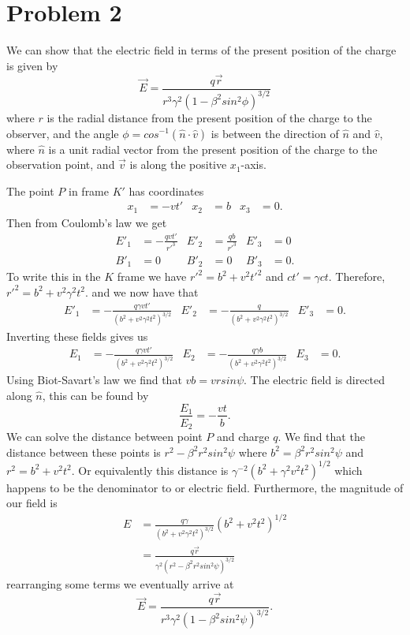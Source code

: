 \documentclass[11pt]{article}
\begin{document}
\section*{Problem 2}

We can show that the electric field in terms of the present position of the charge is given by
$$
\vec{E} = \frac{q\vec{r}}{r^{3}\gamma^{2}(1 - \beta^{2} sin^{2} \phi)^{3/2}}
$$
where $r$ is the radial distance from the present position of the charge to the observer, and the angle $\phi = cos^{-1}(\hat{n} \cdot \hat{v})$ is between the direction of $\hat{n}$ and $\hat{v}$, where $\hat{n}$ is a unit radial vector from the present position of the charge to the observation point, and $\vec{v}$ is along the positive $x_{1}$-axis.

The point $P$ in frame $K'$ has coordinates
\begin{align*}
    x_{1} &= -vt' &  x_{2} &= b &  x_{3} &= 0.
\end{align*}
Then from Coulomb's law we get
\begin{align*}
    E'_{1} &= -\frac{qvt'}{r'^{3}} &  E'_{2} &= \frac{qb}{r'^{3}} &  E'_{3} &= 0 \\
    B'_{1} &= 0 &  B'_{2} &= 0 &  B'_{3} &= 0.
\end{align*}
To write this in the $K$ frame we have $r'^{2} = b^{2} + v^{2}t'^{2}$ and $ct' = \gamma c t$. Therefore, $r'^{2} = b^{2} + v^{2} \gamma^{2} t^{2}$. and we now have that
\begin{align*}
    E'_{1} &= -\frac{q\gamma vt'}{(b^{2} + v^{2} \gamma^{2} t^{2})^{3/2}} &  E'_{2} &= -\frac{q}{(b^{2} + v^{2} \gamma^{2} t^{2})^{3/2}} &  E'_{3} &= 0.
\end{align*}
Inverting these fields gives us
\begin{align*}
    E_{1} &= -\frac{q\gamma vt'}{(b^{2} + v^{2} \gamma^{2} t^{2})^{3/2}} &  E_{2} &= -\frac{q\gamma b}{(b^{2} + v^{2} \gamma^{2} t^{2})^{3/2}} &  E_{3} &= 0.
\end{align*}
Using Biot-Savart's law we find that $vb = v r sin \psi$. The electric field is directed along $\hat{n}$, this can be found by 
$$
\frac{E_{1}}{E_{2}} = -\frac{vt}{b}.
$$
We can solve the distance between point $P$ and charge $q$. We find that the distance between these points is $r^{2} - \beta^{2} r^{2} sin^{2} \psi$ where $b^{2} = \beta^{2} r^{2} sin^{2} \psi$ and $r^{2} = b^{2} + v^{2} t^{2}$. Or equivalently this distance is $\gamma^{-2}(b^{2} + \gamma^{2} v^{2} t^{2})^{1/2}$ which happens to be the denominator to or electric field. Furthermore, the magnitude of our field is
\begin{align*}
E &= \frac{q\gamma}{(b^{2} + v^{2} \gamma^{2} t^{2})^{3/2}}(b^{2} + v^{2} t^{2})^{1/2} \\
&= \frac{q \vec{r}}{\gamma^{2}(r^{2} - \beta^{2} r^{2} sin^{2} \psi)^{3/2}}
\end{align*}
rearranging some terms we eventually arrive at
$$
\vec{E} = \frac{q\vec{r}}{r^{3}\gamma^{2}(1 - \beta^{2} sin^{2} \psi)^{3/2}}.
$$
\end{document}
